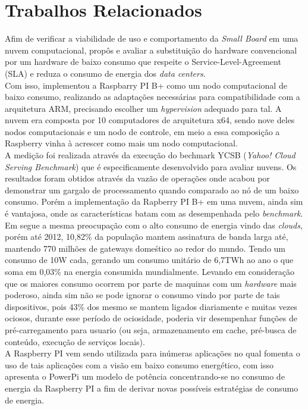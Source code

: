 \documentclass[12pt]{article}
\begin{document}
\section{Trabalhos Relacionados} \label{sec:trabCorrelatos}
  Afim de verificar a viabilidade de uso e comportamento da \textit{Small Board} em uma nuvem computacional, \cite{Joao} propôs e avaliar a substituição do hardware convencional por um hardware de baixo consumo que respeite o Service-Level-Agreement (SLA) e reduza o consumo de energia dos \textit{data centers}.\\
  Com isso, implementou a Raspbarry PI B+ como um nodo computacional de baixo consumo, realizando as adaptações necessárias para compatibilidade com a arquitetura ARM, precisando escolher um \textit{hypervision} adequado para tal. A nuvem era composta por 10 computadores de arquitetura x64, sendo nove deles nodos computacionais e um nodo de controle, em meio a essa composição a Raspberry vinha à acrescer como mais um nodo computacional.\\
  A medição foi realizada através da execução do bechmark YCSB (\textit{Yahoo! Cloud Serving Benchmark}) que é especificamente desenvolvido para avaliar nuvens. Os resultados foram obtidos através da vazão de operações onde acabou por demonstrar um gargalo de processamento quando comparado ao nó de um baixo consumo. Porém a implementação da Rapberry PI B+ em uma nuvem, ainda sim é vantajosa, onde as características batam com as desempenhada pelo \textit{benchmark}.\\
  Em \cite{PiConsumo} segue a mesma preocupação com o alto consumo de energia vindo das \textit{clouds}, porém até 2012, 10,82\% da população mantem assinatura de banda larga até, mantendo 770 milhões de gateways domeśtico ao redor do mundo. Tendo um consumo de 10W cada, gerando um consumo unitário de 6,7TWh ao ano o que soma em 0,03\% na energia consumida mundialmente. Levando em consideração que os maiores consumo ocorrem por parte de maquinas com um \textit{hardware} mais poderoso, ainda sim não se pode ignorar o consumo vindo por parte de tais dispositivos, pois 43\% dos mesmo se mantem ligados diariamente e muitas vezes ociosos, durante esse período de ociosidade, poderia vir desempenhar funções de pré-carregamento para usuario (ou seja, armazenamento em cache, pré-busca de conteúdo, execução de serviços locais).\\
  A Raspberry PI vem sendo utilizada para inúmeras aplicações no qual fomenta o uso de tais aplicações com a visão em baixo consumo energético, com isso \cite{PiConsumo} apresenta o PowerPi um modelo de  potência concentrando-se no consumo de energia da Raspberry PI a fim de derivar novas possíveis estratégias de consumo de energia.\\
\end{document}
